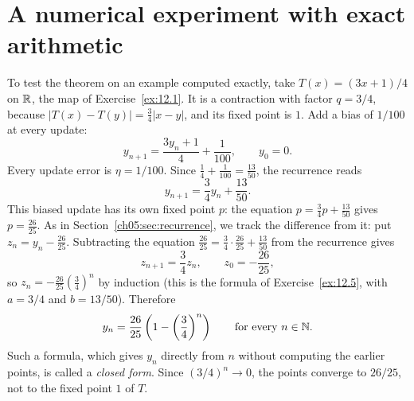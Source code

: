 \section{A numerical experiment with exact arithmetic}\label{ch18:sec:experiment}
To test the theorem on an example computed exactly, take $T(x)=(3x+1)/4$ on $\mathbb R$, the map of Exercise~\ref{ex:12.1}. It is a contraction with factor $q=3/4$, because $|T(x)-T(y)|=\frac34|x-y|$, and its fixed point is $1$. Add a bias of $1/100$ at every update:
\[
 y_{n+1}=\frac{3y_n+1}{4}+\frac1{100},\qquad y_0=0.
\]
Every update error is $\eta=1/100$. Since $\frac14+\frac1{100}=\frac{13}{50}$, the recurrence reads
\[
 y_{n+1}=\frac34 y_n+\frac{13}{50}.
\]
This biased update has its own fixed point $p$: the equation $p=\frac34p+\frac{13}{50}$ gives $p=\frac{26}{25}$. As in Section~\ref{ch05:sec:recurrence}, we track the difference from it: put $z_n=y_n-\frac{26}{25}$. Subtracting the equation $\frac{26}{25}=\frac34\cdot\frac{26}{25}+\frac{13}{50}$ from the recurrence gives
\[
 z_{n+1}=\frac34 z_n,\qquad z_0=-\frac{26}{25},
\]
so $z_n=-\frac{26}{25}\left(\frac34\right)^n$ by induction (this is the formula of Exercise~\ref{ex:12.5}, with $a=3/4$ and $b=13/50$). Therefore
\[
 y_n=\frac{26}{25}\left(1-\left(\frac34\right)^n\right)\qquad\text{for every }n\in\mathbb N.
\]
Such a formula, which gives $y_n$ directly from $n$ without computing the earlier points, is called a \emph{closed form}. Since $(3/4)^n\to0$, the points converge to $26/25$, not to the fixed point $1$ of $T$.

